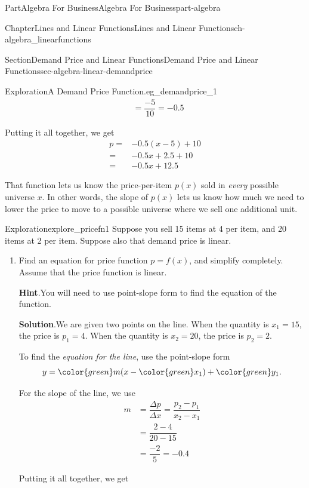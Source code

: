 \documentclass{tufte-book}
\newcommand{\blocktitlefont}{\relax}
\numberwithin{equation}{chapter}
\newcommand{\amp}{&}
\begin{document}
\begin{partptx}{Part}{Algebra For Business}{}{Algebra For Business}{}{}{part-algebra}
\begin{chapterptx}{Chapter}{Lines and Linear Functions}{}{Lines and Linear Functions}{}{}{ch-algebra_linearfunctions}
\begin{sectionptx}{Section}{Demand Price and Linear Functions}{}{Demand Price and Linear Functions}{}{}{sec-algebra-linear-demandprice}
\begin{exploration}{Exploration}{A Demand Price Function.}{eg_demandprice_1}
\begin{align*}
\amp = \dfrac{-5}{10}=-0.5
\end{align*}
%
\par
Putting it all together, we get%
\begin{align*}
p = \amp -0.5 (x-5) + 10\\
= \amp -0.5x + 2.5 + 10\\
= \amp -0.5x + 12.5
\end{align*}
%
\end{exploration}%
\par
That function lets us know the price-per-item \(p(x)\) sold in \emph{every} possible universe \(x\). In other words, the slope of \(p(x)\) lets us know how much we need to lower the price to move to a possible universe where we sell one additional unit.%
\begin{exploration}{Exploration}{}{explore_pricefn1}%
Suppose you sell 15 items at 4 \textdollar{} per item, and 20 items at 2 \textdollar{} per item. Suppose also that demand price is linear.%
\begin{enumerate}[font=\bfseries,label=(\alph*),ref=\alph*]%
\item{}Find an equation for price function \(p=f(x)\), and simplify completely.  Assume that the price function is linear.%
\par\smallskip%
\noindent\textbf{\blocktitlefont Hint}.\hypertarget{explore_pricefn1-2-2}{}\quad{}You will need to use point-slope form to find the equation of the function.%
\par\smallskip%
\noindent\textbf{\blocktitlefont Solution}.\hypertarget{explore_pricefn1-2-3}{}\quad{}We are given two points on the line.  When the quantity is \(x_1=15\), the price is \(p_1=4\).  When the quantity is \(x_2=20\), the price is \(p_2=2\).%
\par
To find the \emph{equation for the line}, use the point-slope form%
\begin{equation*}
y = {\color{green} m} (x - { \color{green} x_1}) + {\color{green} y_1} \text{.}
\end{equation*}
%
\par
For the slope of the line, we use%
\begin{align*}
m \amp = \dfrac{\Delta p}{\Delta x} = \dfrac{p_2-p_1}{x_2-x_1}\\
\amp = \dfrac{2-4}{20-15}\\
\amp = \dfrac{-2}{5}=-0.4
\end{align*}
%
\par
Putting it all together, we get%
\begin{equation*}

\end{equation*}
\end{enumerate}
\end{exploration}
\end{sectionptx}
\end{chapterptx}
\end{partptx}
\end{document}
